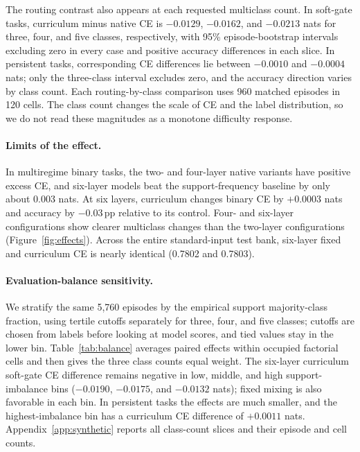 \documentclass{article}
\newcommand{\pp}{\,\mathrm{pp}}
\begin{document}


The routing contrast also appears at each requested multiclass count. In soft-gate tasks, curriculum minus native CE is $-0.0129$, $-0.0162$, and $-0.0213$ nats for three, four, and five classes, respectively, with 95\% episode-bootstrap intervals excluding zero in every case and positive accuracy differences in each slice. In persistent tasks, corresponding CE differences lie between $-0.0010$ and $-0.0004$ nats; only the three-class interval excludes zero, and the accuracy direction varies by class count. Each routing-by-class comparison uses 960 matched episodes in 120 cells. The class count changes the scale of CE and the label distribution, so we do not read these magnitudes as a monotone difficulty response.

\paragraph{Limits of the effect.} In multiregime binary tasks, the two- and four-layer native variants have positive excess CE, and six-layer models beat the support-frequency baseline by only about 0.003 nats. At six layers, curriculum changes binary CE by $+0.0003$ nats and accuracy by $-0.03\pp$ relative to its control. Four- and six-layer configurations show clearer multiclass changes than the two-layer configurations (Figure~\ref{fig:effects}). Across the entire standard-input test bank, six-layer fixed and curriculum CE is nearly identical (0.7802 and 0.7803).

\paragraph{Evaluation-balance sensitivity.} We stratify the same 5,760 episodes by the empirical support majority-class fraction, using tertile cutoffs separately for three, four, and five classes; cutoffs are chosen from labels before looking at model scores, and tied values stay in the lower bin. Table~\ref{tab:balance} averages paired effects within occupied factorial cells and then gives the three class counts equal weight. The six-layer curriculum soft-gate CE difference remains negative in low, middle, and high support-imbalance bins ($-0.0190$, $-0.0175$, and $-0.0132$ nats); fixed mixing is also favorable in each bin. In persistent tasks the effects are much smaller, and the highest-imbalance bin has a curriculum CE difference of $+0.0011$ nats. Appendix~\ref{app:synthetic} reports all class-count slices and their episode and cell counts.
\end{document}
